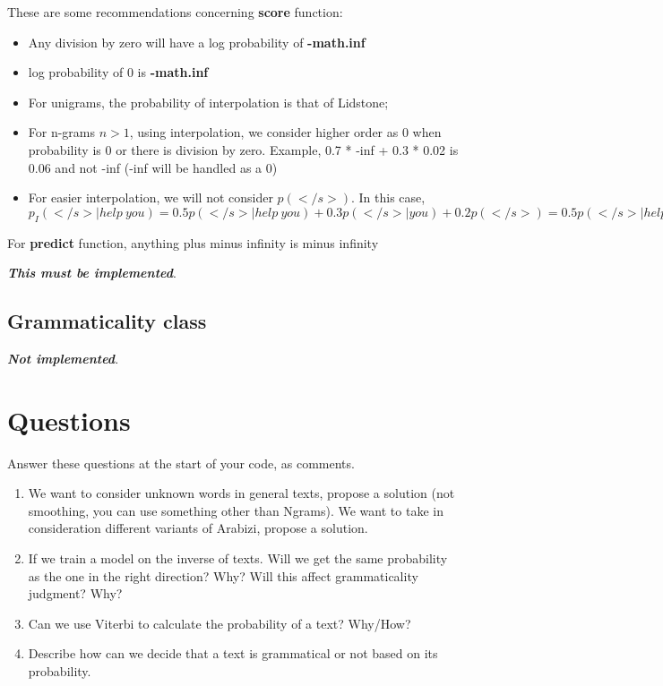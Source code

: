 \documentclass[11pt, a4paper]{article}
\begin{document}
These are some recommendations concerning \textbf{score} function:
\begin{itemize}
	\item Any division by zero will have a log probability of \textbf{-math.inf}
	\item log probability of 0 is \textbf{-math.inf}
	\item For unigrams, the probability of interpolation is that of Lidstone;
	\item For n-grams $ n>1 $, using interpolation, we consider higher order as 0 when probability is 0 or there is division by zero.
	Example, 0.7 * -inf + 0.3 * 0.02 is 0.06 and not -inf (-inf will be handled as a 0)
	
	\item For easier interpolation, we will not consider $ p(</s>) $.
	In this case, $ p_I(</s>|help\ you) = 0.5 p(</s>|help\ you) + 0.3 p(</s>|you) + 0.2 p(</s>) = 0.5 p(</s>|help\ you) + 0.3 p(</s>|you)$
\end{itemize}

For \textbf{predict} function, anything plus minus infinity is minus infinity

\textbf{\slshape This must be implemented}.

\subsection{Grammaticality class}


\textbf{\slshape Not implemented}.

\section{Questions}

Answer these questions at the start of your code, as comments.
\begin{enumerate}
	\item We want to consider unknown words in general texts, propose a solution (not smoothing, you can use something other than Ngrams).
	We want to take in consideration different variants of Arabizi, propose a solution.
	
	\item If we train a model on the inverse of texts.
	Will we get the same probability as the one in the right direction? Why?
	Will this affect grammaticality judgment? Why?
	
	\item Can we use Viterbi to calculate the probability of a text? Why/How?
	
	\item Describe how can we decide that a text is grammatical or not based on its probability.
	
\end{enumerate}
\end{document}
